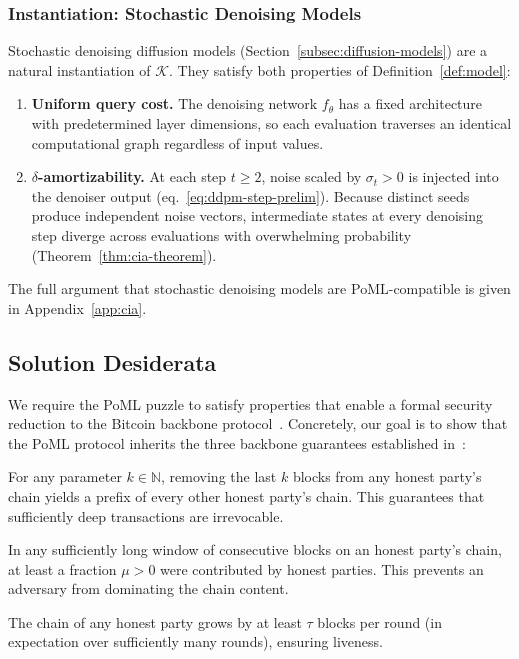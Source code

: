 \subsubsection{Instantiation: Stochastic Denoising Models}
\label{subsec:diffusion-instantiation}

Stochastic denoising diffusion models (Section~\ref{subsec:diffusion-models}) are a natural instantiation of $\mathcal{K}$. They satisfy both properties of Definition~\ref{def:model}: 
\begin{enumerate}
    \item \textbf{Uniform query cost.} The denoising network $f_\theta$ has a fixed architecture with predetermined layer dimensions, so each evaluation traverses an identical computational graph regardless of input values.
    \item \textbf{$\delta$-amortizability.} At each step $t \geq 2$, noise scaled by $\sigma_t > 0$ is injected into the denoiser output (eq.~\eqref{eq:ddpm-step-prelim}). Because distinct seeds produce independent noise vectors, intermediate states at every denoising step diverge across evaluations with overwhelming probability (Theorem~\ref{thm:cia-theorem}).
\end{enumerate}
The full argument that stochastic denoising models are PoML-compatible is given in Appendix~\ref{app:cia}.

\subsection{Solution Desiderata}

We require the PoML puzzle to satisfy properties that enable a formal security reduction to the Bitcoin backbone protocol~\cite{GKL20}. Concretely, our goal is to show that the PoML protocol inherits the three backbone guarantees established in~\cite{GKL20}:

\begin{description}[nosep]
\item[Common Prefix (CP).] For any parameter $k \in \mathbb{N}$, removing the last $k$ blocks from any honest party's chain yields a prefix of every other honest party's chain. This guarantees that sufficiently deep transactions are irrevocable.
\item[Chain Quality (CQ).] In any sufficiently long window of consecutive blocks on an honest party's chain, at least a fraction $\mu > 0$ were contributed by honest parties. This prevents an adversary from dominating the chain content.
\item[Chain Growth (CG).] The chain of any honest party grows by at least $\tau$ blocks per round (in expectation over sufficiently many rounds), ensuring liveness.
\end{description}


